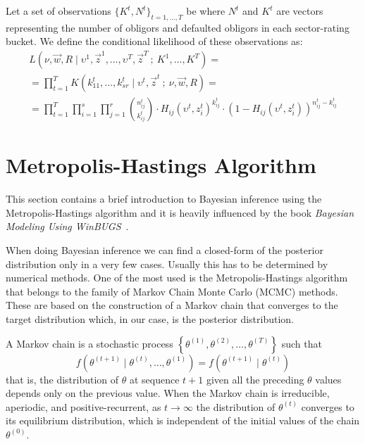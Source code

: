 \documentclass[11pt,fleqn]{book} %
\begin{document}
\begin{definition}
	Let a set of observations $\{K^t, N^t\}_{t=1,\dots,T}$ be where $N^t$ 
	and $K^t$ are vectors representing the number of obligors and defaulted 
	obligors in each sector-rating bucket. We define the conditional 
	likelihood of these observations as:
	\begin{displaymath}
		\begin{array}{l}
			L(\nu,\vec{w},R \mid \upsilon^1,\vec{z}^1,\dots,\upsilon^T,\vec{z}^T\ ;\ K^1,\dots,K^T) = \\
			= \displaystyle \prod_{t=1}^T K(k_{11}^t,\dots,k_{sr}^t \mid \upsilon^t,\vec{z}^t\ ;\ \nu,\vec{w},R) = \\
			= \displaystyle
			\prod_{t=1}^T \prod_{i=1}^s \prod_{j=1}^r 
			\binom{n_{ij}^t}{k_{ij}^t} \cdot
			H_{ij}(\upsilon^t,z_i^t)^{k_{ij}^t} \cdot
			\left( 1 - H_{ij}(\upsilon^t,z_i^t) \right)^{n_{ij}^t-k_{ij}^t}
		\end{array}
	\end{displaymath}
\end{definition}

\section{Metropolis-Hastings Algorithm}

This section contains a brief introduction to Bayesian inference using the 
Metropolis-Hastings algorithm and it is heavily influenced by the book 
\emph{Bayesian Modeling Using WinBUGS}~\cite{ntzoufras:2009}.

When doing Bayesian inference we can find a closed-form of the posterior 
distribution only in a very few cases. Usually this has to be determined 
by numerical methods. One of the most used is the Metropolis-Hastings 
algorithm that belongs to the family of Markov Chain Monte Carlo (MCMC) 
methods. These are based on the construction of a Markov chain that converges 
to the target distribution which, in our case, is the posterior distribution.

\begin{definition}
	A Markov chain is a stochastic process 
	$\left\{\theta^{(1)},\theta^{(2)},\dots,\theta^{(T)}\right\}$ such that
	\begin{displaymath}
		f\left(\theta^{(t+1)} \mid \theta^{(t)},\dots,\theta^{(1)}\right) = 
		f\left(\theta^{(t+1)} \mid \theta^{(t)}\right)
	\end{displaymath}
	that is, the distribution of $\theta$ at sequence $t+1$ given all the 
	preceding $\theta$ values depends only on the previous value. 
	When the Markov chain is irreducible, aperiodic, and positive-recurrent, 
	as $t \to \infty$ the distribution of $\theta^{(t)}$ converges to its 
	equilibrium distribution, which is independent of the initial values 
	of the chain $\theta^{(0)}$.
\end{definition}
\end{document}
